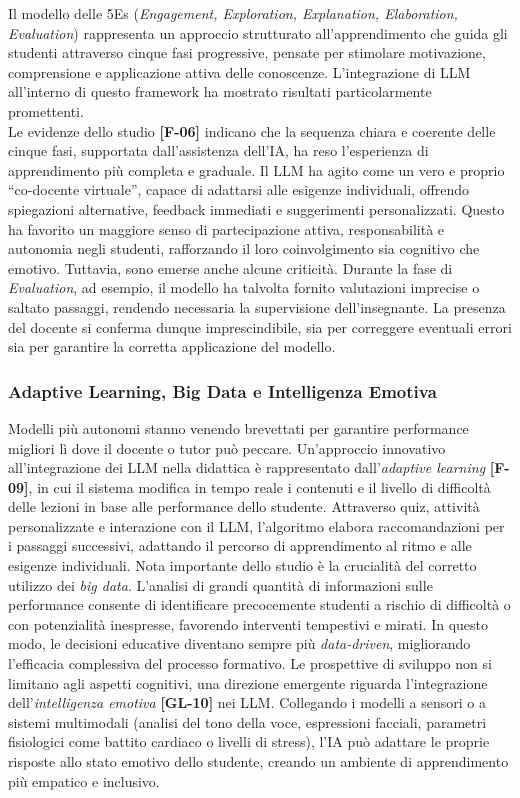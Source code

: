 \documentclass[a4paper,9pt]{article}
\begin{document}
Il modello delle 5Es (\textit{Engagement, Exploration, Explanation, Elaboration, Evaluation}) rappresenta un approccio strutturato all’apprendimento che guida gli studenti attraverso cinque fasi progressive, pensate per stimolare motivazione, comprensione e applicazione attiva delle conoscenze. L’integrazione di LLM all’interno di questo framework ha mostrato risultati particolarmente promettenti.\\ Le evidenze dello studio \textbf{[F-06]} indicano che la sequenza chiara e coerente delle cinque fasi, supportata dall’assistenza dell’IA, ha reso l’esperienza di apprendimento più completa e graduale. Il LLM ha agito come un vero e proprio “co-docente virtuale”, capace di adattarsi alle esigenze individuali, offrendo spiegazioni alternative, feedback immediati e suggerimenti personalizzati. Questo ha favorito un maggiore senso di partecipazione attiva, responsabilità e autonomia negli studenti, rafforzando il loro coinvolgimento sia cognitivo che emotivo. Tuttavia, sono emerse anche alcune criticità. Durante la fase di \textit{Evaluation}, ad esempio, il modello ha talvolta fornito valutazioni imprecise o saltato passaggi, rendendo necessaria la supervisione dell’insegnante. La presenza del docente si conferma dunque imprescindibile, sia per correggere eventuali errori sia per garantire la corretta applicazione del modello.

\subsubsection{Adaptive Learning, Big Data e Intelligenza Emotiva}
Modelli più autonomi stanno venendo brevettati per garantire performance migliori lì dove il docente o tutor può peccare. Un'approccio innovativo all’integrazione dei LLM nella didattica è rappresentato dall’\textit{adaptive learning} \textbf{[F-09]}, in cui il sistema modifica in tempo reale i contenuti e il livello di difficoltà delle lezioni in base alle performance dello studente. Attraverso quiz, attività personalizzate e interazione con il LLM, l’algoritmo elabora raccomandazioni per i passaggi successivi, adattando il percorso di apprendimento al ritmo e alle esigenze individuali.  Nota importante dello studio è la crucialità del corretto utilizzo dei \textit{big data}. L’analisi di grandi quantità di informazioni sulle performance consente di identificare precocemente studenti a rischio di difficoltà o con potenzialità inespresse, favorendo interventi tempestivi e mirati. In questo modo, le decisioni educative diventano sempre più \textit{data-driven}, migliorando l’efficacia complessiva del processo formativo. Le prospettive di sviluppo non si limitano agli aspetti cognitivi, una direzione emergente riguarda l’integrazione dell’\textit{intelligenza emotiva} \textbf{[GL-10]} nei LLM. Collegando i modelli a sensori o a sistemi multimodali (analisi del tono della voce, espressioni facciali, parametri fisiologici come battito cardiaco o livelli di stress), l’IA può adattare le proprie risposte allo stato emotivo dello studente, creando un ambiente di apprendimento più empatico e inclusivo.
\end{document}
